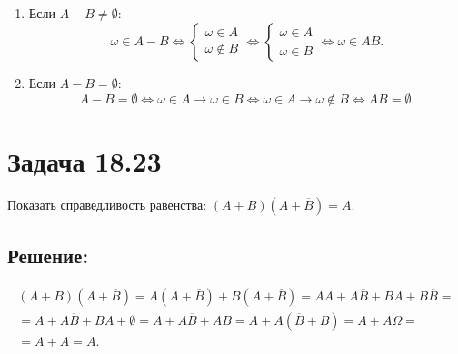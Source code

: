 \begin{enumerate}
    \item Если $A - B \neq \emptyset$:
    \begin{equation}
        \omega \in A - B
        \Leftrightarrow
        \left \{
        \begin{array}{l}
            \omega \in A \\
            \omega \notin B
        \end{array}
        \right .
        \Leftrightarrow
        \left \{
        \begin{array}{l}
            \omega \in A \\
            \omega \in \overline{B}
        \end{array}
        \right .
        \Leftrightarrow
        \omega \in A \overline{B} .
    \end{equation}

    \item Если $A - B = \emptyset$:
    \begin{equation}
        A - B = \emptyset
        \Leftrightarrow
        \omega \in A \rightarrow \omega \in B
        \Leftrightarrow
        \omega \in A \rightarrow \omega \notin \overline{B}
        \Leftrightarrow
        A \overline{B} = \emptyset .
    \end{equation}
\end{enumerate}


\section*{Задача 18.23}

Показать справедливость равенства: $\left ( A + B \right ) \left ( A + \overline{B} \right ) = A$.

\subsection*{Решение:}

\begin{multline}
    \left ( A + B \right ) \left ( A + \overline{B} \right )
    = A \left ( A + \overline{B} \right ) + B \left ( A + \overline{B} \right )
    = A A + A \overline{B} + B A + B \overline{B} = \\
    = A + A \overline{B} + B A + \emptyset
    = A + A \overline{B} + A B
    = A + A \left ( \overline{B} + B \right )
    = A + A \Omega = \\
    = A + A
    = A
    .
\end{multline}

